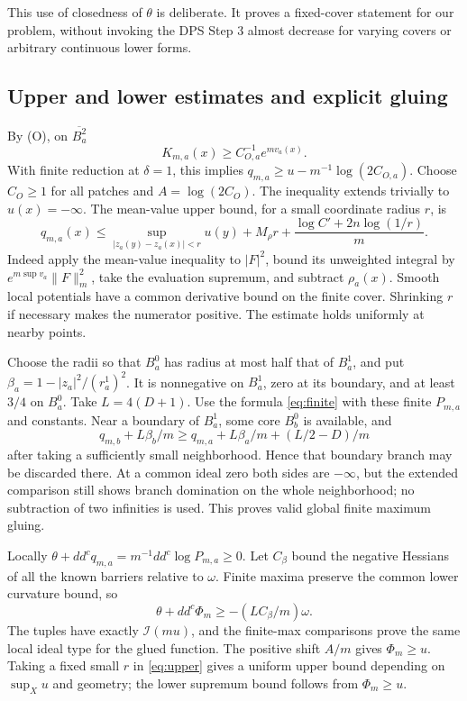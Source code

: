 \documentclass[11pt]{article}
\newcommand{\I}{\mathcal I}
\theoremstyle{definition}
\begin{document}
This use of closedness of $\theta$ is deliberate. It proves a
fixed-cover statement for our problem, without invoking the
DPS Step 3 almost decrease for varying covers or arbitrary
continuous lower forms.

\subsection{Upper and lower estimates and explicit gluing}
By (O), on $\overline{B_a^2}$
\[
 K_{m,a}(x)\geq C_{O,a}^{-1}e^{mv_a(x)}.
\]
With finite reduction at $\delta=1$, this implies
$q_{m,a}\geq u-m^{-1}\log(2C_{O,a})$. Choose
$C_O\geq1$ for all patches and $A=\log(2C_O)$.
The inequality extends trivially to $u(x)=-\infty$.
The mean-value upper bound, for a small coordinate radius $r$,
is
\begin{equation}\label{eq:upper}
 q_{m,a}(x)\leq
 \sup_{|z_a(y)-z_a(x)|<r}u(y)+M_\rho r
 +\frac{\log C'+2n\log(1/r)}m.
\end{equation}
Indeed apply the mean-value inequality to $|F|^2$, bound its
unweighted integral by $e^{m\sup v_a}\|F\|_m^2$, take the
evaluation supremum, and subtract $\rho_a(x)$.
Smooth local potentials have a common derivative bound on the
finite cover. Shrinking $r$ if necessary makes the numerator
positive. The estimate holds uniformly at nearby points.

Choose the radii so that $B_a^0$ has radius at most half that of
$B_a^1$, and put
$\beta_a=1-|z_a|^2/(r_a^1)^2$. It is nonnegative on $B_a^1$,
zero at its boundary, and at least $3/4$ on $B_a^0$.
Take $L=4(D+1)$. Use the formula \eqref{eq:finite} with these
finite $P_{m,a}$ and constants. Near a boundary of $B_a^1$,
some core $B_b^0$ is available, and
\[
 q_{m,b}+L\beta_b/m\geq
 q_{m,a}+L\beta_a/m+(L/2-D)/m
\]
after taking a sufficiently small neighborhood. Hence that
boundary branch may be discarded there. At a common ideal zero
both sides are $-\infty$, but the extended comparison still
shows branch domination on the whole neighborhood; no subtraction
of two infinities is used. This proves valid global finite maximum
gluing.

Locally $\theta+dd^cq_{m,a}=m^{-1}dd^c\log P_{m,a}\geq0$.
Let $C_\beta$ bound the negative Hessians of all the known barriers
relative to $\omega$. Finite maxima preserve the common lower
curvature bound, so
\[
 \theta+dd^c\Phi_m\geq-(LC_\beta/m)\omega.
\]
The tuples have exactly $\I(mu)$, and the finite-max comparisons
prove the same local ideal type for the glued function.
The positive shift $A/m$ gives $\Phi_m\geq u$.
Taking a fixed small $r$ in \eqref{eq:upper} gives a uniform
upper bound depending on $\sup_Xu$ and geometry; the lower
supremum bound follows from $\Phi_m\geq u$.
\end{document}
